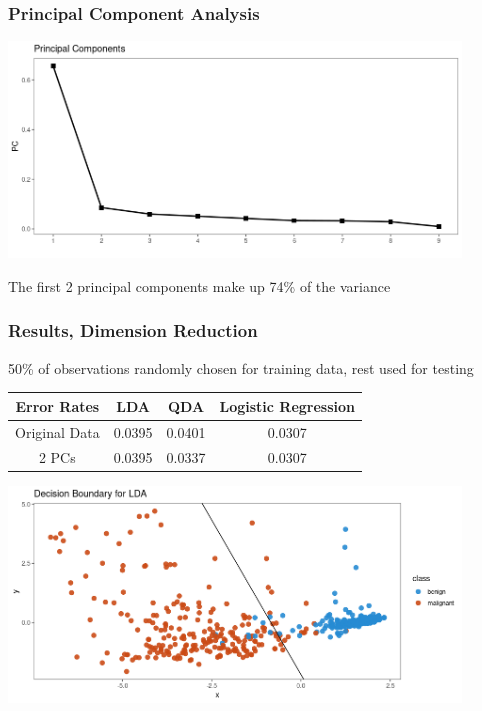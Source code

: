 \documentclass[10pt]{beamer}
\begin{document}
\begin{frame}\frametitle{Principal Component Analysis}
  \begin{center}
    \includegraphics[width=0.9\textwidth]{../images/pca.png}
  \end{center}

  The first 2 principal components make up 74\% of the variance
\end{frame}

\begin{frame}\frametitle{Results, Dimension Reduction}
  50\% of observations randomly chosen for training data, rest used for testing
  \begin{center}
  \begin{tabular}{cccc}
    \toprule
    Error Rates & LDA & QDA & Logistic Regression \\
    \midrule
    Original Data & 0.0395 & 0.0401 & 0.0307 \\
    2 PCs & 0.0395 & 0.0337 & 0.0307 \\
    \bottomrule
  \end{tabular}
\includegraphics[width=0.9\textwidth]{../images/lda.png}
  \end{center}
\end{frame}
\end{document}
